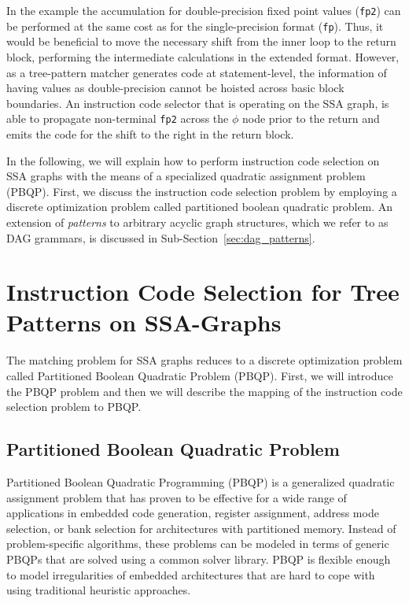 In the example the accumulation for double-precision fixed
point values (\texttt{fp2}) can be performed at the same cost as for the single-precision format (\texttt{fp}). Thus, it would be
beneficial to move the necessary shift from the inner loop to the
return block, performing the intermediate calculations in the extended
format. However, as a tree-pattern matcher generates code at 
statement-level, the information of having values as double-precision
cannot be hoisted across basic block boundaries.
An instruction code selector that is operating on the SSA graph, is able to propagate 
non-terminal \texttt{fp2} across the $\phi$ node prior to the return 
and emits the code for the shift to the right in the return block.

In the following, we will explain how to perform instruction code selection
on SSA graphs with the means of a specialized quadratic assignment
problem (PBQP). First, we discuss the instruction code selection problem by
employing a discrete optimization problem called partitioned boolean
quadratic problem.  An extension of \emph{patterns} to arbitrary
acyclic graph structures, which we refer to as DAG grammars, is
discussed in Sub-Section~\ref{sec:dag_patterns}.

\section{Instruction Code Selection for Tree Patterns on SSA-Graphs}
The matching problem for SSA graphs reduces to a discrete optimization
problem called Partitioned Boolean Quadratic Problem (PBQP).  First,
we will introduce the PBQP problem and then we will describe the
mapping of the instruction code selection problem to PBQP.

\subsection{Partitioned Boolean Quadratic Problem}
\label{sec:pbqp}
Partitioned Boolean Quadratic Programming (PBQP) is a generalized
quadratic assignment problem that has proven to be effective for a
wide range of applications in embedded code generation, \eg
register assignment, address mode selection, or
bank selection for architectures with partitioned memory. Instead of
problem-specific algorithms, these problems can be modeled in terms of
generic {PBQP}s that are solved using a common solver library. PBQP is
flexible enough to model irregularities of embedded architectures that
are hard to cope with using traditional heuristic approaches.

